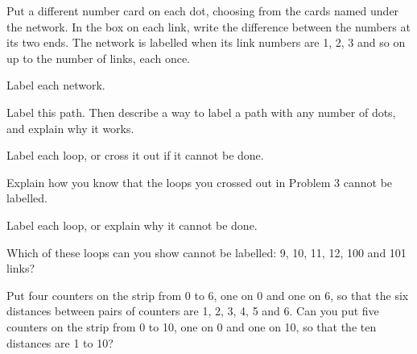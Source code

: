 \documentclass[12pt]{article}
\begin{document}
\setlength{\baselineskip}{17pt}

Put a different number card on each dot, choosing from the cards named under the network. In the box on each link, write the difference between the numbers at its two ends. The network is labelled when its link numbers are 1, 2, 3 and so on up to the number of links, each once.

\medskip
\begin{center}
\end{center}

\vspace{0.5cm}
 Label each network.

\vspace{0.5cm}
\begin{center}

\vspace{1.0cm}
\end{center}

\newpage
{} Label this path. Then describe a way to label a path with any number of dots, and explain why it works.

\vspace{0.8cm}
\begin{center}
\end{center}

\newpage
{} Label each loop, or cross it out if it cannot be done.

\vspace{0.6cm}
\hfill{}

\vspace{0.8cm}
\hfill{}

\newpage
{} Explain how you know that the loops you crossed out in Problem 3 cannot be labelled.

\newpage
{} Label each loop, or explain why it cannot be done.

\vspace{0.8cm}
\begin{center}

\vspace{1.6cm}
\end{center}

\newpage
{} Which of these loops can you show cannot be labelled: 9, 10, 11, 12, 100 and 101 links?

\newpage
{} Put four counters on the strip from 0 to 6, one on 0 and one on 6, so that the six distances between pairs of counters are 1, 2, 3, 4, 5 and 6. Can you put five counters on the strip from 0 to 10, one on 0 and one on 10, so that the ten distances are 1 to 10?
\end{document}
